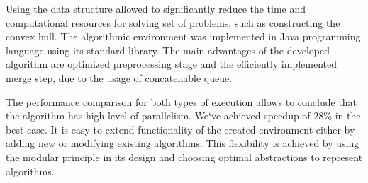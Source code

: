 \documentclass[conference]{IEEEtran}
\theoremstyle{plane}
\begin{document}
Using the data structure allowed to significantly reduce the time and computational resources for solving set of problems, such as constructing the convex hull. The algorithmic environment was implemented in Java programming language using its standard library. The main advantages of the developed algorithm are optimized preprocessing stage and the efficiently implemented merge step, due to the usage of concatenable queue.

The performance comparison for both types of execution allows to conclude that the algorithm has high level of parallelism. We`ve achieved speedup of $28\%$ in the best case. It is easy to extend functionality of the created environment either by adding new or modifying existing algorithms. This flexibility is achieved by using the modular principle in its design and choosing optimal abstractions to represent algorithms.
\end{document}
